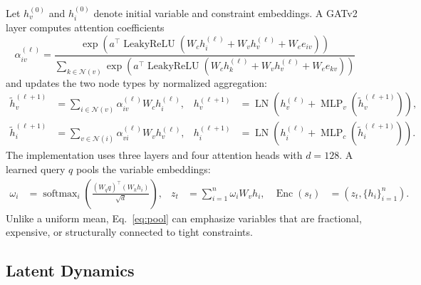 \documentclass[11pt,a4paper]{article}
\newcommand{\softmax}{\operatorname{softmax}}
\begin{document}
Let $h_v^{(0)}$ and $h_i^{(0)}$ denote initial variable and constraint embeddings. A GATv2 layer computes attention coefficients
\begin{equation}
  \alpha_{iv}^{(\ell)}
  =
  \frac{\exp\left(
    a^\top \operatorname{LeakyReLU}
    \left(W_c h_i^{(\ell)}+W_v h_v^{(\ell)}
          +W_e e_{iv}\right)\right)}
  {\sum_{k\in\mathcal{N}(v)}
    \exp\left(
    a^\top \operatorname{LeakyReLU}
    \left(W_c h_k^{(\ell)}+W_v h_v^{(\ell)}
          +W_e e_{kv}\right)\right)}
  \label{eq:attention}
\end{equation}
and updates the two node types by normalized aggregation:
\begin{align}
  \widetilde h_v^{(\ell+1)}
    &=\sum_{i\in\mathcal{N}(v)}
       \alpha_{iv}^{(\ell)}W_c h_i^{(\ell)}, &
  h_v^{(\ell+1)}
    &=\operatorname{LN}\!\left(
      h_v^{(\ell)}+\operatorname{MLP}_v(\widetilde h_v^{(\ell+1)})
      \right), \\
  \widetilde h_i^{(\ell+1)}
    &=\sum_{v\in\mathcal{N}(i)}
       \alpha_{vi}^{(\ell)}W_v h_v^{(\ell)}, &
  h_i^{(\ell+1)}
    &=\operatorname{LN}\!\left(
      h_i^{(\ell)}+\operatorname{MLP}_c(\widetilde h_i^{(\ell+1)})
      \right).
  \label{eq:gnn-update}
\end{align}
The implementation uses three layers and four attention heads with $d=128$. A learned query $q$ pools the variable embeddings:
\begin{align}
  \omega_i&=
  \softmax_i\!\left(\frac{(W_q q)^\top(W_k h_i)}{\sqrt d}\right), &
  z_t&=\sum_{i=1}^{n}\omega_i W_v h_i, &
  \operatorname{Enc}(s_t)&=(z_t,\{h_i\}_{i=1}^{n}).
  \label{eq:pool}
\end{align}
Unlike a uniform mean, Eq.~\eqref{eq:pool} can emphasize variables that are fractional, expensive, or structurally connected to tight constraints.

\subsection{Latent Dynamics}
\end{document}
